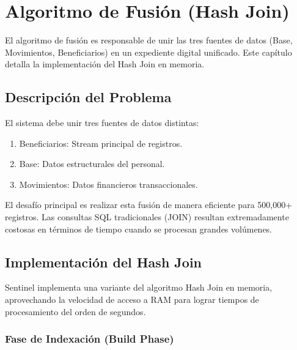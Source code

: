 \chapter{Algoritmo de Fusión (Hash Join)}

\bigskip

El algoritmo de fusión es responsable de unir las tres fuentes de datos (Base, Movimientos, Beneficiarios) en un expediente digital unificado. Este capítulo detalla la implementación del Hash Join en memoria.

\bigskip

\section{Descripción del Problema}

El sistema debe unir tres fuentes de datos distintas:

\bigskip

\begin{enumerate}
    \item Beneficiarios: Stream principal de registros.
    \item Base: Datos estructurales del personal.
    \item Movimientos: Datos financieros transaccionales.
\end{enumerate}

\bigskip

El desafío principal es realizar esta fusión de manera eficiente para 500,000+ registros. Las consultas SQL tradicionales (JOIN) resultan extremadamente costosas en términos de tiempo cuando se procesan grandes volúmenes.

\bigskip

\section{Implementación del Hash Join}

Sentinel implementa una variante del algoritmo Hash Join en memoria, aprovechando la velocidad de acceso a RAM para lograr tiempos de procesamiento del orden de segundos.

\bigskip

\subsection{Fase de Indexación (Build Phase)}

